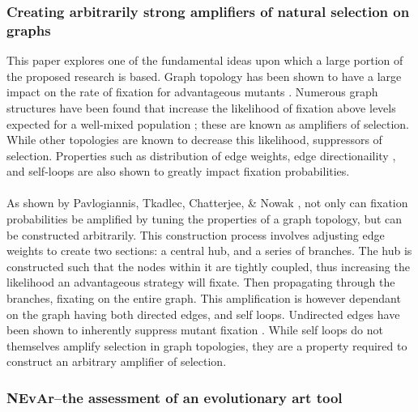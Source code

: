 \documentclass[10pt,a4paper]{article}
\begin{document}
\subsubsection{Creating arbitrarily strong amplifiers of natural selection on graphs \cite{graph-amplifiers}}

This paper explores one of the fundamental ideas upon which a large portion of the proposed research is based.
Graph topology has been shown to have a large impact on the rate of fixation for advantageous mutants \cite{graph-amplifiers, birth-death-amplifiers, cooperation-on-graphs}.
Numerous graph structures have been found that increase the likelihood of fixation above levels expected for a well-mixed population \cite{lieberman2005evolutionary, birth-death-amplifiers}; these are known as amplifiers of selection.
While other topologies are known to decrease this likelihood, suppressors of selection.
Properties such as distribution of edge weights, edge directionaility \cite{birth-death-amplifiers}, and self-loops are also shown to greatly impact fixation probabilities.
\\\\
As shown by Pavlogiannis, Tkadlec, Chatterjee, \& Nowak \cite{graph-amplifiers}, not only can fixation probabilities be amplified by tuning the properties of a graph topology, but can be constructed arbitrarily.
This construction process involves adjusting edge weights to create two sections: a central hub, and a series of branches.
The hub is constructed such that the nodes within it are tightly coupled, thus increasing the likelihood an advantageous strategy will fixate.
Then propagating through the branches, fixating on the entire graph.
This amplification is however dependant on the graph having both directed edges, and self loops.
Undirected edges have been shown to inherently suppress mutant fixation \cite{birth-death-amplifiers}.
While self loops do not themselves amplify selection in graph topologies, they are a property required to construct an arbitrary amplifier of selection.


\subsubsection{NEvAr–the assessment of an evolutionary art tool \cite{nevar}}
\end{document}
